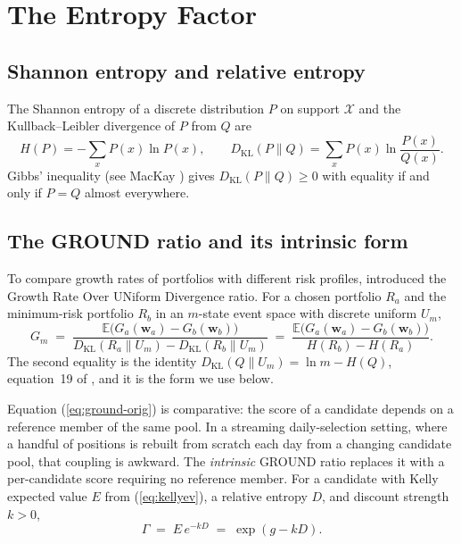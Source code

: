 \documentclass[11pt]{article}
\newcommand{\E}{\mathbb{E}}
\newcommand{\dkl}{D_{\mathrm{KL}}}
\begin{document}
\section{The Entropy Factor}
\label{sec:entropy}

\subsection{Shannon entropy and relative entropy}

The Shannon entropy \cite{shannon1948} of a discrete distribution $P$ on
support $\mathcal{X}$ and the Kullback--Leibler divergence
\cite{kullback1951} of $P$ from $Q$ are
\begin{equation}
H(P) = -\sum_{x} P(x) \ln P(x), \qquad
\dkl(P \| Q) = \sum_{x} P(x) \ln \frac{P(x)}{Q(x)} .
\label{eq:hdkl}
\end{equation}
Gibbs' inequality (see MacKay \cite{mackay2003}) gives
$\dkl(P \| Q) \geq 0$ with equality if and only if $P = Q$ almost everywhere.

\subsection{The GROUND ratio and its intrinsic form}

To compare growth rates of portfolios with different risk profiles,
\cite{mercurio2020binary} introduced the Growth Rate Over UNiform Divergence
ratio. For a chosen portfolio $R_a$ and the minimum-risk portfolio $R_b$ in an
$m$-state event space with discrete uniform $U_m$,
\begin{equation}
G_m \;=\;
\frac{\E\bigl(G_a(\mathbf{w}_a) - G_b(\mathbf{w}_b)\bigr)}
     {\dkl(R_a \| U_m) - \dkl(R_b \| U_m)}
\;=\;
\frac{\E\bigl(G_a(\mathbf{w}_a) - G_b(\mathbf{w}_b)\bigr)}
     {H(R_b) - H(R_a)} .
\label{eq:ground-orig}
\end{equation}
The second equality is the identity
$\dkl(Q \| U_m) = \ln m - H(Q)$, equation~19 of \cite{mercurio2020gepo}, and
it is the form we use below.

Equation (\ref{eq:ground-orig}) is comparative: the score of a candidate
depends on a reference member of the same pool. In a streaming daily-selection
setting, where a handful of positions is rebuilt from scratch each day from a
changing candidate pool, that coupling is awkward. The \emph{intrinsic} GROUND
ratio replaces it with a per-candidate score requiring no reference member.
For a candidate with Kelly expected value $E$ from (\ref{eq:kellyev}), a
relative entropy $D$, and discount strength $k > 0$,
\begin{equation}
\Gamma \;=\; E \, e^{-kD} \;=\; \exp(g - kD) .
\label{eq:intrinsic}
\end{equation}
\end{document}
